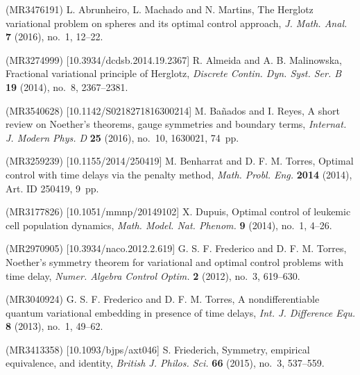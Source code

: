 \documentclass{my-aims}
\theoremstyle{definition}
\begin{document}

\begin{thebibliography}{99}

 (MR3476191)
\newblock L. Abrunheiro, L. Machado and N. Martins, 
\newblock The Herglotz variational problem on spheres and its optimal control approach, 
\newblock \emph{J. Math. Anal.} {\bf 7} (2016), no.~1, 12--22. 

 (MR3274999) [10.3934/dcdsb.2014.19.2367]
\newblock R. Almeida and A. B. Malinowska, 
\newblock Fractional variational principle of Herglotz, 
\newblock \emph{Discrete Contin. Dyn. Syst. Ser. B} {\bf 19} (2014), no.~8, 2367--2381. 

 (MR3540628) [10.1142/S0218271816300214]
\newblock M. Ba{\~n}ados and I. Reyes, 
\newblock A short review on Noether's theorems, gauge symmetries and boundary terms, 
\newblock \emph{Internat. J. Modern Phys. D} {\bf 25} (2016), no.~10, 1630021, 74~pp. 

 (MR3259239) [10.1155/2014/250419]
\newblock M. Benharrat and D. F. M. Torres, 
\newblock Optimal control with time delays via the penalty method, 
\newblock \emph{Math. Probl. Eng.} {\bf 2014} (2014), Art. ID 250419, 9~pp. 
\newblock {}

 (MR3177826) [10.1051/mmnp/20149102] 
\newblock X. Dupuis, 
\newblock Optimal control of leukemic cell population dynamics, 
\newblock \emph{Math. Model. Nat. Phenom.} {\bf 9} (2014), no.~1, 4--26. 

 (MR2970905) [10.3934/naco.2012.2.619]
\newblock G. S. F. Frederico and D. F. M. Torres, 
\newblock Noether's symmetry theorem for variational and optimal control problems with time delay, 
\newblock \emph{Numer. Algebra Control Optim.} {\bf 2} (2012), no.~3, 619--630. 
\newblock {}

 (MR3040924)
\newblock G. S. F. Frederico and D. F. M. Torres, 
\newblock A nondifferentiable quantum variational embedding in presence of time delays, 
\newblock \emph{Int. J. Difference Equ.} {\bf 8} (2013), no.~1, 49--62. 
\newblock {}

 (MR3413358) [10.1093/bjps/axt046] 
\newblock S. Friederich, 
\newblock Symmetry, empirical equivalence, and identity,
\newblock \emph{British J. Philos. Sci.} {\bf 66} (2015), no.~3, 537--559.


\end{thebibliography}
\end{document}
